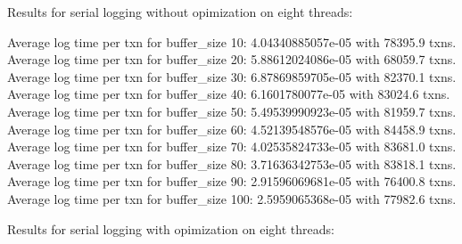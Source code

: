 Results for serial logging without opimization on eight threads:


Average log time per txn for buffer_size 10: 4.04340885057e-05 with 78395.9 txns.
Average log time per txn for buffer_size 20: 5.88612024086e-05 with 68059.7 txns.
Average log time per txn for buffer_size 30: 6.87869859705e-05 with 82370.1 txns.
Average log time per txn for buffer_size 40: 6.1601780077e-05 with 83024.6 txns.
Average log time per txn for buffer_size 50: 5.49539990923e-05 with 81959.7 txns.
Average log time per txn for buffer_size 60: 4.52139548576e-05 with 84458.9 txns.
Average log time per txn for buffer_size 70: 4.02535824733e-05 with 83681.0 txns.
Average log time per txn for buffer_size 80: 3.71636342753e-05 with 83818.1 txns.
Average log time per txn for buffer_size 90: 2.91596069681e-05 with 76400.8 txns.
Average log time per txn for buffer_size 100: 2.5959065368e-05 with 77982.6 txns.

Results for serial logging with opimization on eight threads:
